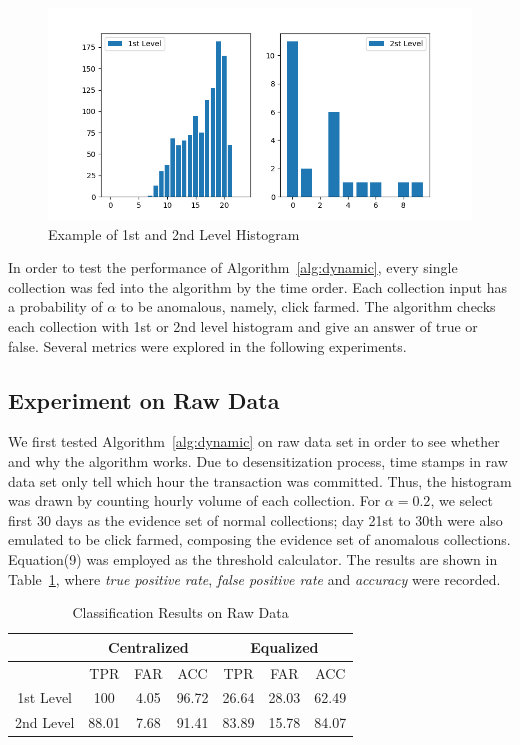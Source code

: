 \documentclass[10pt,conference,letterpaper]{IEEEtran}
\begin{document}
			\begin{figure}[!ht]
				\centering
				\includegraphics[width=\linewidth]{fig/HistogramExample.png}
				\caption{Example of 1st and 2nd Level Histogram}
				\label{fig:histogram-example}
			\end{figure}
	
			In order to test the performance of Algorithm~\ref{alg:dynamic}, every single collection was fed into the algorithm by the time order. Each collection input has a probability of $\alpha$ to be anomalous, namely, click farmed. The algorithm checks each collection with 1st or 2nd level histogram and give an answer of true or false. Several metrics were explored in the following experiments.
			
		\subsection{Experiment on Raw Data}\label{sec:exp-raw}
			We first tested Algorithm~\ref{alg:dynamic} on raw data set in order to see whether and why the algorithm works. Due to desensitization process, time stamps in raw data set only tell which hour the transaction was committed. Thus, the histogram was drawn by counting hourly volume of each collection. For $\alpha = 0.2$, we select first 30 days as the evidence set of normal collections; day 21st to 30th were also emulated to be click farmed, composing the evidence set of anomalous collections. Equation(9) was employed as the threshold calculator. The results are shown in Table~\ref{tab:result-raw-1st}, where \textit{true positive rate}, \textit{false positive rate} and \textit{accuracy} were recorded.
	
			\begin{table}[!ht]
				\centering
				\caption{Classification Results on Raw Data}
				\label{tab:result-raw-1st}
				\begin{tabular}{|c|c|c|c|c|c|c|}
					\hline
					& \multicolumn{3}{c|}{Centralized} & \multicolumn{3}{c|}{Equalized}\\
					\hline
					& TPR & FAR & ACC & TPR & FAR & ACC\\
					\hline
					1st Level & 100 & 4.05 & 96.72 & 26.64 & 28.03 & 62.49\\
					\hline
					2nd Level & 88.01 & 7.68 & 91.41 & 83.89 & 15.78 & 84.07\\
					\hline
				\end{tabular}
			\end{table}
			
\end{document}
